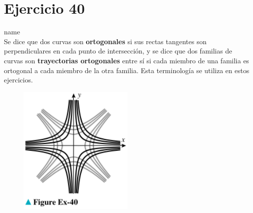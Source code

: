 \documentclass[12pt]{article}
\begin{document}
\section{Ejercicio 40} name \\

Se dice que dos curvas son \textbf{ortogonales} si sus rectas tangentes son perpendiculares en cada punto de intersección, y se dice que dos familias de curvas son \textbf{trayectorias ortogonales} entre sí si cada miembro de una familia es ortogonal a cada miembro de la otra familia. Esta terminología se utiliza en estos ejercicios.
\begin{figure}[h!]
\centering
\includegraphics[width=0.5\textwidth]{../img/img_Lista2/3_40.png}
\end{figure}
\end{document}
